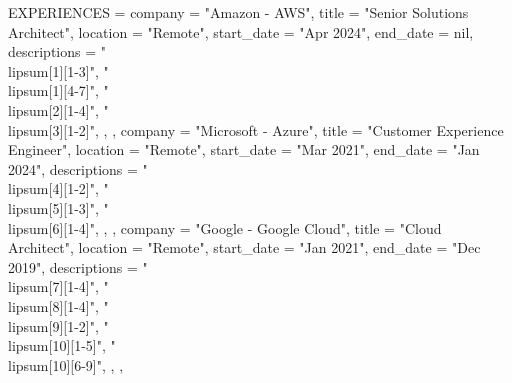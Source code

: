 \begin{luacode}
  EXPERIENCES = {
    {
      company = "Amazon - AWS",
      title = "Senior Solutions Architect",
      location = "Remote",
      start_date = "Apr 2024",
      end_date = nil,
      descriptions = {
        "\\lipsum[1][1-3]",
        "\\lipsum[1][4-7]",
        "\\lipsum[2][1-4]",
        "\\lipsum[3][1-2]",
      },
    },
    {
      company = "Microsoft - Azure",
      title = "Customer Experience Engineer",
      location = "Remote",
      start_date = "Mar 2021",
      end_date = "Jan 2024",
      descriptions = {
        "\\lipsum[4][1-2]",
        "\\lipsum[5][1-3]",
        "\\lipsum[6][1-4]",
      },
    },
    {
      company = "Google - Google Cloud",
      title = "Cloud Architect",
      location = "Remote",
      start_date = "Jan 2021",
      end_date = "Dec 2019",
      descriptions = {
        "\\lipsum[7][1-4]",
        "\\lipsum[8][1-4]",
        "\\lipsum[9][1-2]",
        "\\lipsum[10][1-5]",
        "\\lipsum[10][6-9]",
      },
    },
  }
\end{luacode}
